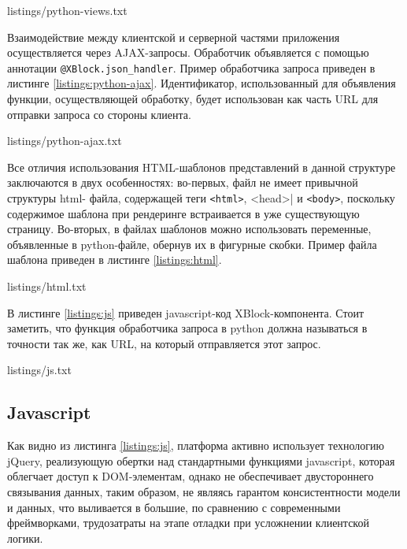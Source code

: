 
{listings/python-views.txt}

Взаимодействие между клиентской и серверной частями приложения
осуществляется через AJAX-запросы. Обработчик объявляется с помощью аннотации
\lstinline|@XBlock.json_handler|. Пример обработчика запроса приведен в листинге \ref{listings:python-ajax}.
Идентификатор, использованный для объявления функции, осуществляющей обработку, будет использован как часть URL для отправки запроса со стороны клиента. 



{listings/python-ajax.txt}


Все отличия использования HTML-шаблонов представлений в данной структуре
заключаются в двух особенностях: во-первых, файл не имеет привычной структуры html- файла, содержащей теги \lstinline|<html>|, \lstinline||<head>| и \lstinline|<body>|, поскольку содержимое шаблона при рендеринге встраивается в уже существующую страницу. Во-вторых, в файлах шаблонов можно использовать переменные, объявленные в python-файле, обернув их в фигурные скобки. Пример файла шаблона приведен в листинге \ref{listings:html}.


{listings/html.txt}

В листинге \ref{listings:js} приведен javascript-код XBlock-компонента. Стоит заметить, что функция обработчика запроса в python должна называться в точности так же, как URL, на который отправляется этот запрос.



{listings/js.txt}

\subsection{Javascript}

Как видно из листинга \ref{listings:js}, платформа активно использует технологию jQuery, реализующую обертки над стандартными функциями javascript, которая облегчает доступ к DOM-элементам, однако не обеспечивает двустороннего связывания данных, таким образом, не являясь гарантом консистентности модели и данных, что выливается в большие, по сравнению с современными фреймворками, трудозатраты на этапе отладки при усложнении клиентской логики.

